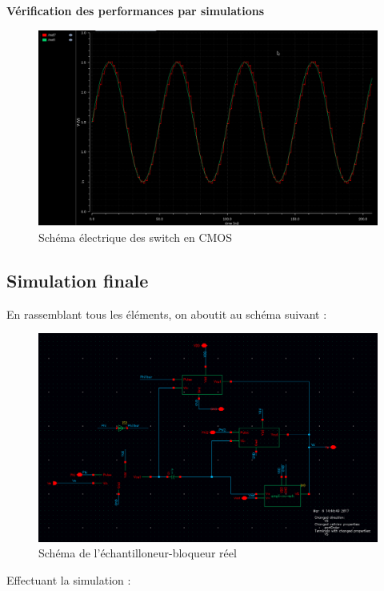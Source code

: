 \documentclass[11pt]{article}
\begin{document}
\textbf{V\'erification des performances par simulations}

\begin{figure}[!htb]
\begin{center}
  \includegraphics[width=0.8\linewidth]{switchs_simu.png}
  \caption{Sch\'ema \'electrique des switch en CMOS}
\end{center}
\end{figure}



\clearpage

\subsection{Simulation finale}
En rassemblant tous les \'el\'ements, on aboutit au sch\'ema suivant :

\begin{figure}[!htb]
\begin{center}
  \includegraphics[width=0.8\linewidth]{EB-Schematic.png}
  \caption{Sch\'ema de l'\'echantilloneur-bloqueur r\'eel}
\end{center}
\end{figure}

Effectuant la simulation :
\end{document}
